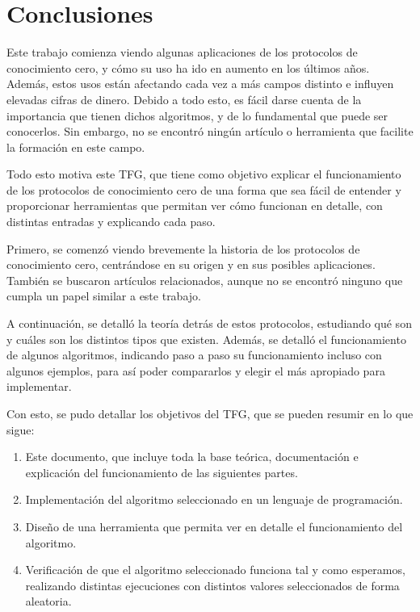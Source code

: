 \section{Conclusiones}

Este trabajo comienza viendo algunas aplicaciones de los protocolos de conocimiento cero, y cómo su uso ha ido en aumento en los últimos años. Además, estos usos están afectando cada vez a más campos distinto e influyen elevadas cifras de dinero. Debido a todo esto, es fácil darse cuenta de la importancia que tienen dichos algoritmos, y de lo fundamental que puede ser conocerlos. Sin embargo, no se encontró ningún artículo o herramienta que facilite la formación en este campo.

Todo esto motiva este TFG, que tiene como objetivo explicar el funcionamiento de los protocolos de conocimiento cero de una forma que sea fácil de entender y proporcionar herramientas que permitan ver cómo funcionan en detalle, con distintas entradas y explicando cada paso.

Primero, se comenzó viendo brevemente la historia de los protocolos de conocimiento cero, centrándose en su origen y en sus posibles aplicaciones. También se buscaron artículos relacionados, aunque no se encontró ninguno que cumpla un papel similar a este trabajo.

A continuación, se detalló la teoría detrás de estos protocolos, estudiando qué son y cuáles son los distintos tipos que existen. Además, se detalló el funcionamiento de algunos algoritmos, indicando paso a paso su funcionamiento incluso con algunos ejemplos, para así poder compararlos y elegir el más apropiado para implementar.

Con esto, se pudo detallar los objetivos del TFG, que se pueden resumir en lo que sigue:
\begin{enumerate}
    \item Este documento, que incluye toda la base teórica, documentación e explicación del funcionamiento de las siguientes partes.

    \item Implementación del algoritmo seleccionado en un lenguaje de programación.

    \item Diseño de una herramienta que permita ver en detalle el funcionamiento del algoritmo.

    \item Verificación de que el algoritmo seleccionado funciona tal y como esperamos, realizando distintas ejecuciones con distintos valores seleccionados de forma aleatoria.
\end{enumerate}

